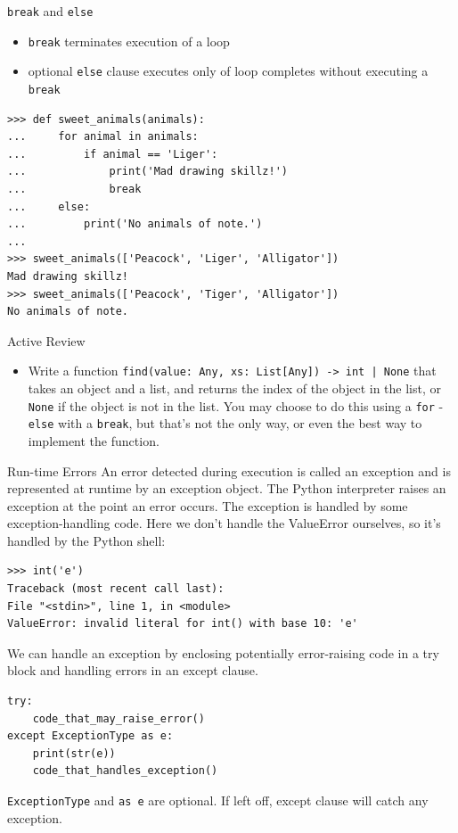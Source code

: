 \documentclass[smaller, aspectratio=1610]{beamer}
\begin{document}
\begin{frame}[label={sec:org5fad8aa},fragile]{\texttt{break} and \texttt{else}}
 \begin{itemize}
\item \texttt{break} terminates execution of a loop
\item optional \texttt{else} clause executes only of loop completes without executing a \texttt{break}
\end{itemize}

\lstset{language=Python,label= ,caption= ,captionpos=b,numbers=none}
\begin{lstlisting}
>>> def sweet_animals(animals):
...     for animal in animals:
...         if animal == 'Liger':
...             print('Mad drawing skillz!')
...             break
...     else:
...         print('No animals of note.')
...
>>> sweet_animals(['Peacock', 'Liger', 'Alligator'])
Mad drawing skillz!
>>> sweet_animals(['Peacock', 'Tiger', 'Alligator'])
No animals of note.
\end{lstlisting}

\begin{block}{Active Review}
\begin{itemize}
\item Write a function \texttt{find(value: Any, xs: List[Any]) -> int | None} that takes an object and a list, and returns the index of the object in the list, or \texttt{None} if the object is not in the list.  You may choose to do this using a \texttt{for} - \texttt{else} with a \texttt{break}, but that's not the only way, or even the best way to implement the function.
\end{itemize}
\end{block}
\end{frame}

\begin{frame}[label={sec:orgfbab234},fragile]{Run-time Errors}
 An error detected during execution is called an exception and is represented at runtime by an exception object. The Python interpreter raises an exception at the point an error occurs. The exception is handled by some exception-handling code. Here we don't handle the ValueError ourselves, so it's handled by the Python shell:

\lstset{language=Python,label= ,caption= ,captionpos=b,numbers=none}
\begin{lstlisting}
>>> int('e')
Traceback (most recent call last):
File "<stdin>", line 1, in <module>
ValueError: invalid literal for int() with base 10: 'e'
\end{lstlisting}

We can handle an exception by enclosing potentially error-raising code
in a try block and handling errors in an except clause.

\lstset{language=Python,label= ,caption= ,captionpos=b,numbers=none}
\begin{lstlisting}
try:
    code_that_may_raise_error()
except ExceptionType as e:
    print(str(e))
    code_that_handles_exception()
\end{lstlisting}

\texttt{ExceptionType} and \texttt{as e} are optional. If left off, except clause will catch any
exception.
\end{frame}
\end{document}
